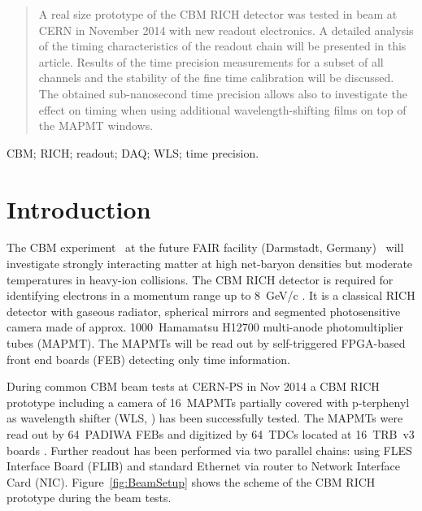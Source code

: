 \documentclass[final,5p,times,twocolumn]{elsarticle}
\begin{document}
\begin{frontmatter}

\begin{abstract}
A real size prototype of the CBM RICH detector was tested in beam at CERN in November 2014 with new readout electronics. A detailed analysis of the timing characteristics of the readout chain  will be presented in this article. Results of the time precision measurements for a subset of all channels and the stability of the fine time calibration will be discussed. The obtained sub-nanosecond time precision allows also to investigate the effect on timing when using additional wavelength-shifting films on top of the MAPMT windows.
\end{abstract}

\begin{keyword}
CBM; RICH; readout; DAQ; WLS; time precision.
\end{keyword}

\end{frontmatter}


\section{Introduction}

The CBM experiment~\cite{CBM} at the future FAIR facility (Darmstadt, Germany)~\cite{FAIR} will investigate strongly interacting matter at high net-baryon densities but moderate temperatures in heavy-ion collisions. The CBM RICH detector is required for identifying electrons in a momentum range up to 8~GeV/c \cite{CBMRICH1, CBMRICH2, CBMRICHPROJECT}. It is a classical RICH detector with gaseous radiator, spherical mirrors and segmented photosensitive camera made of approx. 1000~Hamamatsu H12700 multi-anode photomultiplier tubes (MAPMT). The MAPMTs will be read out by self-triggered FPGA-based front end boards (FEB) detecting only time information.

During common CBM beam tests at CERN-PS in Nov 2014 a CBM RICH prototype including a camera of 16~MAPMTs partially covered with p-terphenyl as wavelength shifter (WLS, \cite{WLS}) has been successfully tested. The MAPMTs were read out by 64~PADIWA FEBs and digitized by 64~TDCs located at 16~TRB~v3 boards \cite{TRB}. Further readout has been performed via two parallel chains: using FLES \cite{FLES} Interface Board (FLIB) and standard Ethernet via router to Network Interface Card (NIC). Figure~\ref{fig:BeamSetup} shows the scheme of the CBM RICH prototype during the beam tests.
\end{document}
